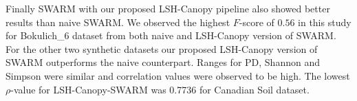 \documentclass[10pt, conference, compsocconf]{IEEEtran}
\begin{document}
Finally SWARM with our proposed LSH-Canopy pipeline also showed better results than naive SWARM. We observed the highest $F$-score of $0.56$ in this study for 
Bokulich\_6 dataset from both naive and LSH-Canopy version of SWARM. For the other two synthetic datasets our proposed LSH-Canopy version of SWARM outperforms the naive counterpart. Ranges for PD, Shannon and Simpson were similar and correlation values were observed to be high. The lowest $\rho$-value for LSH-Canopy-SWARM was 0.7736 for Canadian Soil dataset.          

\begin{table}[t]
\centering 
\caption{\textbf{Performance Comparison}} 
\label{table:performanceTable}

\end{table}
\end{document}
